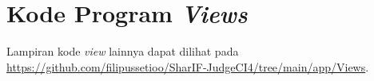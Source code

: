 \chapter{Kode Program \textit{Views}}
\label{lamp:C}








Lampiran kode \textit{view} lainnya dapat dilihat pada \url{https://github.com/filipussetioo/SharIF-JudgeCI4/tree/main/app/Views}.